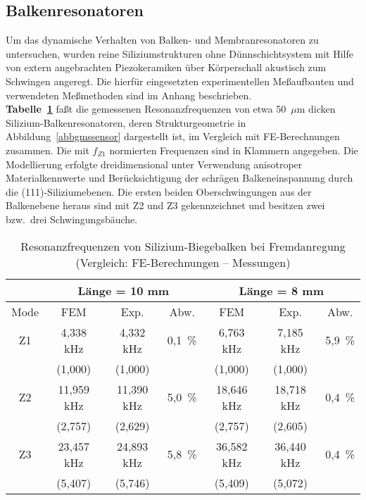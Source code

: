 \subsection{Balkenresonatoren}
\label{balkenresonatoren}

Um das dynamische Verhalten von Balken- und Membranresonatoren
zu untersuchen, wurden reine Siliziumstrukturen ohne Dünnschichtsystem
mit Hilfe von extern angebrachten Piezokeramiken über Körperschall
akustisch zum Schwingen angeregt. Die hierfür eingesetzten experimentellen
Meßaufbauten und verwendeten Meßmethoden sind im Anhang beschrieben.\\
%
{\bf Tabelle~\ref{tabbalkenfreq}} faßt die gemessenen Resonanzfrequenzen
von etwa 50~$\mu$m dicken Silizium-Balkenresonatoren,
deren Strukturgeometrie in Abbildung~\ref{abbgmssensor} dargestellt ist,
im Vergleich mit FE-Berechnungen zusammen. Die mit $f_{Z1}$ normierten
Frequenzen sind in Klammern angegeben. Die Modellierung erfolgte
dreidimensional unter Verwendung anisotroper Materialkennwerte \cite{LB82}
und Berücksichtigung der schrägen Balkeneinspannung durch die
(111)-Siliziumebenen. Die ersten beiden Oberschwingungen aus der
Balkenebene heraus sind mit Z2 und Z3 gekennzeichnet und besitzen zwei
bzw.\ drei Schwingungsbäuche.
\begin{table}[htb]
\caption{\label{tabbalkenfreq}
 Resonanzfrequenzen von Silizium-Biegebalken bei Fremdanregung
 (Vergleich: FE-Berechnungen -- Messungen)}
\begin{center}
\begin{tabular} {|c||c|c|c||c|c|c|}
\cline{1-7}
   & \multicolumn{3}{c||}{Länge = 10 mm} & \multicolumn{3}{c|}{Länge = 8 mm} \\
\hline
Mode  & FEM  & Exp. & Abw. & FEM & Exp. & Abw. \\
\hline \hline
Z1 & 4,338 kHz  &  4,332 kHz & 0,1~\% &  6,763 kHz & 7,185 kHz  & 5,9~\% \\
   & (1,000)    &  (1,000)   &       &  (1,000)   & (1,000)    & \\
\hline
Z2 & 11,959 kHz & 11,390 kHz & 5,0~\% & 18,646 kHz & 18,718 kHz & 0,4~\% \\
   & (2,757)    &  (2,629)   &       &  (2,757)   & (2,605)    & \\
\hline
Z3 & 23,457 kHz & 24,893 kHz & 5,8~\% & 36,582 kHz & 36,440 kHz & 0,4~\% \\
   & (5,407)    &  (5,746)   &       &  (5,409)   & (5,072)    & \\
\hline
\end{tabular}\\
\end{center}
\end{table}
